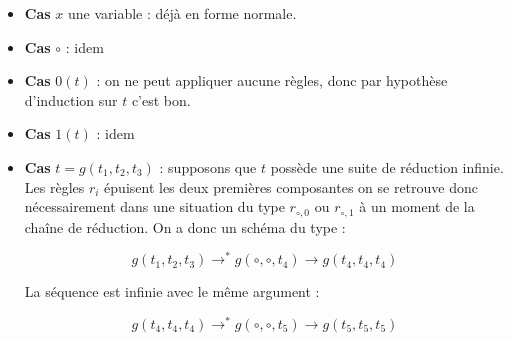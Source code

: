 \documentclass[12pt,letterpaper,boxed]{hmcpset}
\begin{document}
\begin{solution}
\begin{itemize}
\begin{itemize}
\item \textbf{Cas} $x$ une variable : déjà en forme normale.
\item \textbf{Cas} $\circ$ : idem
\item \textbf{Cas} $0(t)$ : on ne peut appliquer aucune règles, donc par hypothèse d'induction sur $t$ c'est bon.
\item \textbf{Cas} $1(t)$ : idem
\item \textbf{Cas} $t = g(t_{1},t_{2},t_{3})$ : supposons que $t$ possède une suite de réduction infinie. Les règles $r_{i}$ épuisent les deux premières composantes on se retrouve donc nécessairement dans une situation du type $r_{\circ,0}$ ou $r_{\circ,1}$ à un moment de la chaîne de réduction. On a donc un schéma du type :

$$ g(t_{1}, t_{2}, t_{3}) \to^{*} g(\circ, \circ, t_{4}) \to g(t_{4}, t_{4}, t_{4})$$

La séquence est infinie avec le même argument : 

$$ g(t_{4}, t_{4}, t_{4}) \to^{*} g(\circ, \circ, t_{5}) \to g(t_{5}, t_{5}, t_{5}) $$

\end{itemize}

\end{itemize}

\end{solution}
\end{document}
